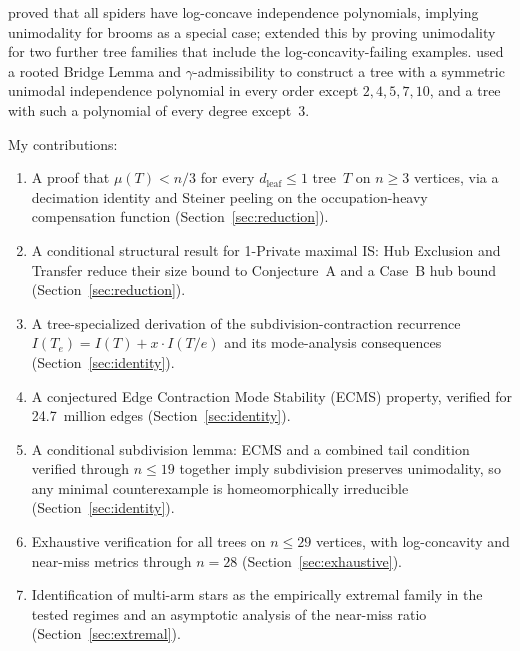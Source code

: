 \documentclass[12pt,oneside]{article}
\theoremstyle{remark}
\newcommand{\dleaf}{d_{\mathrm{leaf}}}    %
\begin{document}
\textcite{li2025spiders} proved that all spiders have log-concave independence polynomials, implying unimodality for brooms as a special case; \textcite{li2026unimodality} extended this by proving unimodality for two further tree families that include the \textcite{kadrawi2025} log-concavity-failing examples.
\textcite{hibi2026symmetric} used a rooted Bridge Lemma and $\gamma$-admissibility to construct a tree with a symmetric unimodal independence polynomial in every order except $2,4,5,7,10$, and a tree with such a polynomial of every degree except~$3$.

My contributions:
\begin{enumerate}
  \item A proof that $\mu(T) < n/3$ for every $\dleaf \le 1$ tree~$T$ on $n\ge3$ vertices, via a decimation identity and Steiner peeling on the occupation-heavy compensation function (Section~\ref{sec:reduction}).
  \item A conditional structural result for 1-Private maximal IS: Hub Exclusion and Transfer reduce their size bound to Conjecture~A and a Case~B hub bound (Section~\ref{sec:reduction}).
  \item A tree-specialized derivation of the subdivision-contraction recurrence $I(T_e) = I(T) + x \cdot I(T/e)$ and its mode-analysis consequences (Section~\ref{sec:identity}).
  \item A conjectured Edge Contraction Mode Stability (ECMS) property, verified for 24.7~million edges (Section~\ref{sec:identity}).
  \item A conditional subdivision lemma: ECMS and a combined tail condition verified through $n \le 19$ together imply subdivision preserves unimodality, so any minimal counterexample is homeomorphically irreducible (Section~\ref{sec:identity}).
  \item Exhaustive verification for all trees on $n \le 29$ vertices, with log-concavity and near-miss metrics through $n = 28$ (Section~\ref{sec:exhaustive}).
  \item Identification of multi-arm stars as the empirically extremal family in the tested regimes and an asymptotic analysis of the near-miss ratio (Section~\ref{sec:extremal}).
\end{enumerate}
\end{document}
